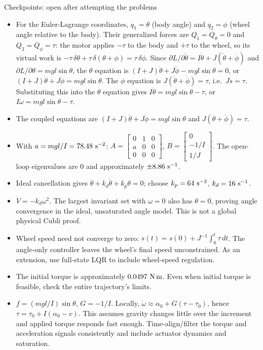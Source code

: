 \documentclass[
]{article}
\providecommand{\tightlist}{%
  \setlength{\itemsep}{0pt}\setlength{\parskip}{0pt}}
\begin{document}
Checkpoints: open after attempting the problems

\begin{itemize}
\tightlist
\item
  For the Euler-Lagrange coordinates, \(q_1=\theta\) (body angle) and
  \(q_2=\phi\) (wheel angle relative to the body). Their generalized
  forces are \(Q_1=Q_\theta=0\) and \(Q_2=Q_\phi=\tau\): the motor
  applies \(-\tau\) to the body and \(+\tau\) to the wheel, so its
  virtual work is
  \(-\tau\,\delta\theta+\tau\,\delta(\theta+\phi)=\tau\,\delta\phi\).
  Since
  \(\partial L/\partial\dot\theta=I\dot\theta+J(\dot\theta+\dot\phi)\)
  and \(\partial L/\partial\theta=mgl\sin\theta\), the \(\theta\)
  equation is \((I+J)\ddot\theta+J\ddot\phi-mgl\sin\theta=0\), or
  \((I+J)\ddot\theta+J\ddot\phi=mgl\sin\theta\). The \(\phi\) equation
  is \(J(\ddot\theta+\ddot\phi)=\tau\), i.e.~\(J\dot s=\tau\).
  Substituting this into the \(\theta\) equation gives
  \(I\ddot\theta=mgl\sin\theta-\tau\), or
  \(I\dot\omega=mgl\sin\theta-\tau\).
\item
  The coupled equations are
  \((I+J)\ddot\theta+J\ddot\phi=mgl\sin\theta\) and
  \(J(\ddot\theta+\ddot\phi)=\tau\).
\item
  With \(a=mgl/I=78.48\ {\rm s^{-2}}\):
  \(A=\begin{bmatrix}0&1&0\\a&0&0\\0&0&0\end{bmatrix}\),
  \(B=\begin{bmatrix}0\\-1/I\\1/J\end{bmatrix}\). The open-loop
  eigenvalues are \(0\) and approximately \(\pm8.86\ {\rm s^{-1}}\).
\item
  Ideal cancellation gives \(\ddot\theta+k_d\dot\theta+k_p\theta=0\);
  choose \(k_p=64\ {\rm s^{-2}}\), \(k_d=16\ {\rm s^{-1}}\).
\item
  \(\dot V=-k_d\omega^2\). The largest invariant set with \(\omega=0\)
  also has \(\theta=0\), proving angle convergence in the ideal,
  unsaturated angle model. This is not a global physical Cubli proof.
\item
  Wheel speed need not converge to zero:
  \(s(t)=s(0)+J^{-1}\int_0^t\tau\,dt\). The angle-only controller leaves
  the wheel's final speed unconstrained. As an extension, use full-state
  LQR to include wheel-speed regulation.
\item
  The initial torque is approximately \(0.0497\ {\rm N\,m}\). Even when
  initial torque is feasible, check the entire trajectory's limits.
\item
  \(f=(mgl/I)\sin\theta\), \(G=-1/I\). Locally,
  \(\dot\omega\approx\alpha_0+G(\tau-\tau_0)\), hence
  \(\tau=\tau_0+I(\alpha_0-v)\). This assumes gravity changes little
  over the increment and applied torque responds fast enough.
  Time-align/filter the torque and acceleration signals consistently and
  include actuator dynamics and saturation.
\end{itemize}
\end{document}
